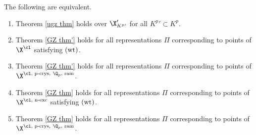 \begin{prop}
\notready {}
The following are equivalent.
\begin{enumerate}
\item[1.]  Theorem \ref{ugz thm} holds over $\X'_{K^{p}{}'}$ for all $K^{p}{}'\subset K^{p}$.





\item[2a.] 
Theorem \ref{GZ thm'} holds for all representations $\Pi$ corresponding to points of $\X^{\cl}$ satisfying $\textup{(wt)}$.
\item[2b.] 
Theorem \ref{GZ thm'} holds for all representations $\Pi$ corresponding to points of $\X^{\cl, \textup{ p-crys}, \ \Q_{p}, \textup{ ram}}$.



\item[3a.]  Theorem \ref{GZ thm}   holds for all representations $\Pi$ corresponding to points of $\X^{\cl, \textup{ n-exc}}$ satisfying $\textup{(wt)}$.
\item[3b.]  Theorem \ref{GZ thm}  holds for all  representations $\Pi$ corresponding to points of
$\X^{\cl, \textup{ p-crys}, \ \Q_{p}, \textup{ ram}}$.
\end{enumerate}
\end{prop}
